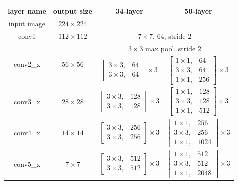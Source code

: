 \iffalse
\begin{table}[]
\centering
\begin{tabular}{ | c | c | c | c | }
\hline
layer name			& output size 					& 34-layer																& 50-layer																			\\ \hline
input image			& $224 \times 224$				& \multicolumn{2}{c|}{}																																	\\ \hline
conv1				& $112 \times112$				& \multicolumn{2}{c|}{$ 7 \times 7$, $64$, stride $2$}																												\\ \hline
\multirow{2}{*}{conv2\_x}	& \multirow{2}{*}{$56 \times 56$} 	& \multicolumn{2}{c|}{$3 \times 3$ max pool, stride $2$}																											\\ \cline{3-4} 
					&							& $\begin{bmatrix} 3 \times 3, &   64 \\ 3 \times 3, &   64 \end{bmatrix} \times 3 $		& $\begin{bmatrix}1 \times 1, & 64 \\ 3 \times 3, & 64 \\ 1 \times 1, & 256 \end{bmatrix}^{} \times 3 $ 		\\ \hline
conv3\_x				& $28 \times 28$				& $\begin{bmatrix} 3 \times 3, & 128 \\ 3 \times 3, & 128 \end{bmatrix} \times 3 $		& $\begin{bmatrix}1 \times 1, & 128 \\ 3 \times 3, & 128 \\ 1 \times 1, & 512 \end{bmatrix} \times 3$		\\ \hline
conv4\_x				& $14 \times 14$				& $\begin{bmatrix} 3 \times 3, & 256 \\ 3 \times 3, & 256 \end{bmatrix} \times 3 $		& $\begin{bmatrix}1 \times 1, & 256 \\ 3 \times 3, & 256 \\ 1 \times 1, & 1024 \end{bmatrix} \times 3$		\\ \hline
conv5\_x				& $  7 \times   7$				& $\begin{bmatrix} 3 \times 3, & 512 \\ 3 \times 3, & 512 \end{bmatrix} \times 3 $		& $\begin{bmatrix}1 \times 1, & 512 \\ 3 \times 3, & 512 \\ 1 \times 1, & 2048 \end{bmatrix} \times 3$		\\ \hline

\end{tabular}
\end{table}
